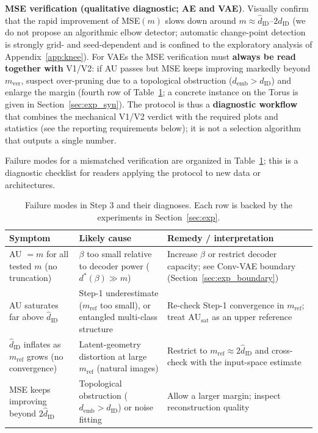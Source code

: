 \documentclass[make,article,submit,pdftex,moreauthors]{Definitions/mdpi}
\newcommand{\dID}{d_{\mathrm{ID}}}
\newcommand{\hatdID}{\hat{d}_{\mathrm{ID}}}
\newcommand{\AUsat}{\mathrm{AU}_{\mathrm{sat}}}
\newcommand{\demb}{d_{\mathrm{emb}}}
\newcommand{\dstar}{d^{*}(\beta)}
\begin{document}
\textbf{MSE verification (qualitative diagnostic; AE and VAE)}.
Visually confirm that the rapid improvement of MSE$(m)$ slows down
around $m \approx \hatdID$--$2\hatdID$ (we do not propose an
algorithmic elbow detector; automatic change-point detection is
strongly grid- and seed-dependent and is confined to the exploratory
analysis of Appendix~\ref{app:knee}).
For VAEs the MSE verification must \textbf{always be read together with}
V1/V2: if AU passes but MSE keeps improving markedly beyond
$m_{\mathrm{ver}}$, suspect over-pruning due to a topological obstruction
($\demb > \dID$) and enlarge the margin (fourth row of
Table~\ref{tab:failure}; a concrete instance on the Torus is given in
Section~\ref{sec:exp_syn}).
The protocol is thus a \textbf{diagnostic workflow} that combines the
mechanical V1/V2 verdict with the required plots and statistics (see the
reporting requirements below); it is not a selection algorithm that outputs
a single number.

Failure modes for a mismatched verification are organized in
Table~\ref{tab:failure}; this is a diagnostic checklist for readers applying
the protocol to new data or architectures.

\begin{table}[H]
\caption{Failure modes in Step 3 and their diagnoses. Each row is backed by
the experiments in Section~\ref{sec:exp}.}
\label{tab:failure}
\small
\begin{tabular}{p{3.9cm}p{4.3cm}p{4.3cm}}
\toprule
\textbf{Symptom} & \textbf{Likely cause} & \textbf{Remedy / interpretation} \\
\midrule
AU $= m$ for all tested $m$ (no truncation) & $\beta$ too small relative to decoder power ($\dstar \gg m$) & Increase $\beta$ or restrict decoder capacity; see Conv-VAE boundary (Section~\ref{sec:exp_boundary}) \\
AU saturates far above $\hatdID$ & Step-1 underestimate ($m_{\mathrm{ref}}$ too small), or entangled multi-class structure & Re-check Step-1 convergence in $m_{\mathrm{ref}}$; treat $\AUsat$ as an upper reference \\
$\hatdID$ inflates as $m_{\mathrm{ref}}$ grows (no convergence) & Latent-geometry distortion at large $m_{\mathrm{ref}}$ (natural images) & Restrict to $m_{\mathrm{ref}} \approx 2\hatdID$ and cross-check with the input-space estimate \\
MSE keeps improving beyond $2\hatdID$ & Topological obstruction ($\demb > \dID$) or noise fitting & Allow a larger margin; inspect reconstruction quality \\
\bottomrule
\end{tabular}
\end{table}
\end{document}
